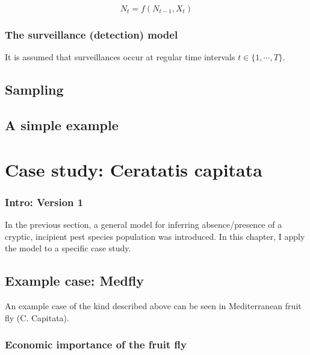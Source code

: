 \documentclass[
]{book}
\begin{document}
\[
N_t = f(N_{t-1}, X_t)
\]

\hypertarget{the-surveillance-detection-model}{%
\subsection{The surveillance (detection) model}\label{the-surveillance-detection-model}}

It is assumed that surveillances occur at regular time intervals \(t \in \{1, \cdots, T\}\).

\hypertarget{sampling}{%
\section{Sampling}\label{sampling}}

\hypertarget{a-simple-example}{%
\section{A simple example}\label{a-simple-example}}

\hypertarget{case-study-ceratatis-capitata}{%
\chapter{Case study: Ceratatis capitata}\label{case-study-ceratatis-capitata}}

\hypertarget{intro-version-1}{%
\subsection{Intro: Version 1}\label{intro-version-1}}

In the previous section, a general model for inferring absence/presence of a cryptic, incipient pest species population was introduced. In this chapter, I apply the model to a specific case study.

\hypertarget{example-case-medfly}{%
\section{Example case: Medfly}\label{example-case-medfly}}

An example case of the kind described above can be seen in Mediterranean fruit fly (C. Capitata).

\hypertarget{economic-importance-of-the-fruit-fly}{%
\subsection{Economic importance of the fruit fly}\label{economic-importance-of-the-fruit-fly}}
\end{document}

